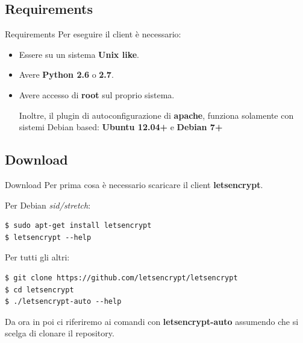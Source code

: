 \documentclass[xcolor=svgnames,11pt]{beamer}
\begin{document}
\subsection{Requirements}
\begin{frame}{Requirements}
Per eseguire il client è necessario:
\begin{itemize}
  \item Essere su un sistema \textbf{Unix like}.
  \item Avere \textbf{Python 2.6} o \textbf{2.7}.
  \item Avere accesso di \textbf{root} sul proprio sistema.

\medskip\pause

Inoltre, il plugin di autoconfigurazione di \textbf{apache}, funziona solamente con
sistemi Debian based: \textbf{Ubuntu 12.04+} e \textbf{Debian 7+}

\end{itemize}
\end{frame}

\subsection{Download}
\begin{frame}[fragile]{Download}
Per prima cosa è necessario scaricare il client \textbf{letsencrypt}.

\medskip\pause
Per Debian \emph{sid/stretch}:
\begin{block}{}
\begin{scriptsize}
\begin{verbatim}
$ sudo apt-get install letsencrypt
$ letsencrypt --help
\end{verbatim}
\end{scriptsize}
\end{block}

\medskip\pause
Per tutti gli altri:
\begin{block}{}
\begin{scriptsize}
\begin{verbatim}
$ git clone https://github.com/letsencrypt/letsencrypt
$ cd letsencrypt
$ ./letsencrypt-auto --help
\end{verbatim}
\end{scriptsize}
\end{block}

\medskip\pause

Da ora in poi ci riferiremo ai comandi con \textbf{letsencrypt-auto} assumendo che
si scelga di clonare il repository.

\end{frame}
\end{document}
